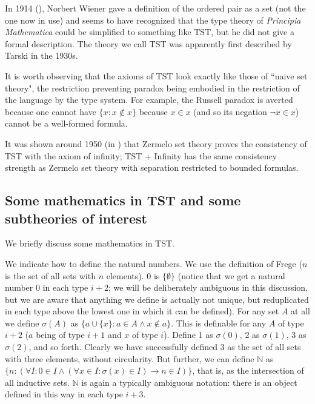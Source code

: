 \documentclass[112pt]{article}
\theoremstyle{definition}
\theoremstyle{remark}
\begin{document}
In 1914 (\cite{wiener}), Norbert Wiener gave a definition of the ordered pair as a set (not the one now in use) and seems to have recognized that the type theory of {\em Principia Mathematica\/} could be simplified to something like TST, but he did not give a formal description.  The theory we call TST was apparently first described by Tarski in the 1930s.

It is worth observing that the axioms of TST look exactly like those of ``naive set theory", the restriction preventing paradox being embodied in the restriction of the language by the type system.
For example, the Russell paradox is averted because one cannot have $\{x:x \not\in x\}$ because $x \in x$ (and so its negation $\neg x \in x$) cannot be a well-formed formula.

It was shown around 1950 (in \cite{kemeny}) that Zermelo set theory proves the consistency of TST with the axiom of infinity;  TST + Infinity has the same consistency strength as
Zermelo set theory with separation restricted to bounded formulas.




\newpage

\subsection{Some mathematics in TST and some subtheories of interest}

We briefly discuss some mathematics in TST.

We indicate how to define the natural numbers.  We use the definition of Frege ($n$ is the set of all sets with $n$ elements).  0 is $\{\emptyset\}$ (notice that we get a natural number 0 in each type $i+2$;  we will be deliberately ambiguous in this discussion, but we are aware that anything we define is actually not unique, but reduplicated in each type above the lowest one in which it can be defined).  For any set $A$ at all we define $\sigma(A)$ as $\{a \cup \{x\}:a \in A \wedge x \not\in a\}$.  This is definable for any $A$ of type $i+2$ ($a$ being of type $i+1$ and $x$ of type $i$).  Define 1 as $\sigma(0)$, 2 as $\sigma(1)$,  3 as $\sigma(2)$, and so forth.  Clearly we have successfully defined 3 as the set of all sets with three elements, without circularity.
But further, we can define $\mathbb N$ as $\{n:(\forall I:0 \in I \wedge (\forall x \in I:\sigma(x) \in I) \rightarrow n \in I)\}$, that is, as the intersection of all inductive sets.
$\mathbb N$ is again a typically ambiguous notation:  there is an object defined in this way in each type $i+3$.
\end{document}
